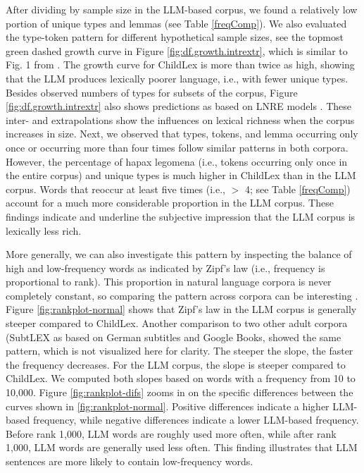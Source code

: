 \documentclass[jou, a4paper]{apa7}
\begin{document}
After dividing by sample size in the LLM-based corpus, we found a relatively low portion of unique types and lemmas (see Table \ref{freqComp}). We also evaluated the type-token pattern for different hypothetical sample sizes, see the topmost green dashed growth curve in Figure \ref{fig:df.growth.intrextr}, which is similar to Fig. 1 from \citep{schroeder_childlex_2015}. The growth curve for ChildLex is more than twice as high, showing that the LLM produces lexically poorer language, i.e., with fewer unique types. Besides observed numbers of types for subsets of the corpus, Figure \ref{fig:df.growth.intrextr} also shows predictions as based on LNRE models \citep{evert_simple_2004, baayen_word_2001}. These inter- and extrapolations show the influences on lexical richness when the corpus increases in size. Next, we observed that types, tokens, and lemma occurring only once or occurring more than four times follow similar patterns in both corpora. However, the percentage of hapax legomena (i.e., tokens occurring only once in the entire corpus) and unique types is much higher in ChildLex than in the LLM corpus. Words that reoccur at least five times (i.e., $>$ 4; see Table \ref{freqComp}) account for a much more considerable proportion in the LLM corpus. These findings indicate and underline the subjective impression that the LLM corpus is lexically less rich. 

More generally, we can also investigate this pattern by inspecting the balance of high and low-frequency words as indicated by Zipf's law (i.e., frequency is proportional to rank). This proportion in natural language corpora is never completely constant, so comparing the pattern across corpora can be interesting \citep[see, e.g., ][]{baayen_analyzing_2008, piantadosi_zipfs_2014, baayen_word_2001}. Figure \ref{fig:rankplot-normal} shows that Zipf's law in the LLM corpus is generally steeper compared to ChildLex. Another comparison to two other adult corpora (SubtLEX as based on German subtitles and Google Books, \citep{brysbaert_impact_2016} showed the same pattern, which is not visualized here for clarity. The steeper the slope, the faster the frequency decreases. For the LLM corpus, the slope is steeper compared to ChildLex. We computed both slopes based on words with a frequency from 10 to 10,000. Figure \ref{fig:rankplot-difs} zooms in on the specific differences between the curves shown in \ref{fig:rankplot-normal}. Positive differences indicate a higher LLM-based frequency, while negative differences indicate a lower LLM-based frequency. Before rank 1,000, LLM words are roughly used more often, while after rank 1,000, LLM words are generally used less often. This finding illustrates that LLM sentences are more likely to contain low-frequency words.  
\end{document}

